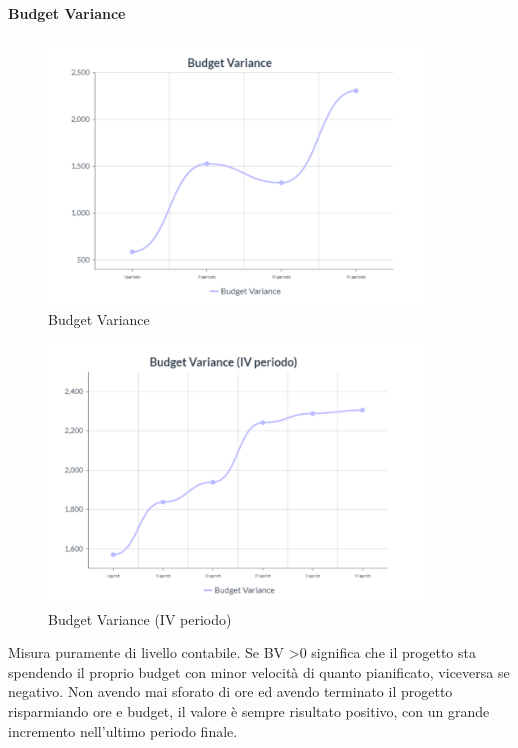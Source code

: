 \paragraph{Budget Variance}
\begin{center}
\begin{figure}[H]
  \centering
  \renewcommand{\thefigure}{11}
  \includegraphics[width=10cm]{./res/images/BVGraph.png}
  \caption{Budget Variance}
  \label{fig:Grafico Budget Variance}
\end{figure}
\end{center}
\begin{center}
\begin{figure}[H]
  \centering
  \renewcommand{\thefigure}{12}
  \includegraphics[width=10cm]{./res/images/BVGraphSprint.png}
  \caption{Budget Variance (IV periodo)}
  \label{fig:Grafico Budget Variance (IV periodo)}
\end{figure}
\end{center}
Misura puramente di livello contabile. Se BV \textgreater  0 significa che il progetto sta spendendo il proprio budget con minor velocità di quanto pianificato, viceversa se negativo. Non avendo mai sforato di ore ed avendo terminato il progetto risparmiando ore e budget, il valore è sempre risultato positivo, con un grande incremento nell'ultimo periodo finale.

